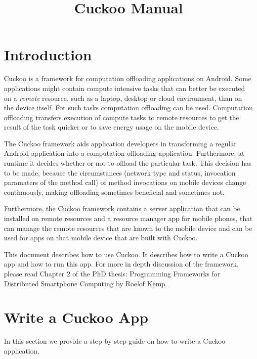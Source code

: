 \documentclass{article}
\begin{document}
\title{Cuckoo Manual}

\maketitle


\section{Introduction}
Cuckoo is a framework for computation offloading applications on Android. Some
applications might contain compute intensive tasks that can better be executed
on a \emph{remote} resource, such as a laptop, desktop or cloud environment,
than on the device itself. For such tasks computation offloading can be used.
Computation offloading transfers execution of compute tasks to remote resources
to get the result of the task quicker or to save energy usage on the mobile
device.

The Cuckoo framework aids application developers in transforming a regular
Android application into a computation offloading application. Furthermore, at
runtime it decides whether or not to offload the particular task. This decision
has to be made, because the circumstances (network type and status, invocation
paramaters of the method call) of method invocations on mobile devices change
continuously, making offloading sometimes beneficial and sometimes not.

Furthermore, the Cuckoo framework contains a server application that can be
installed on remote resources and a resource manager app for mobile phones, that
can manage the remote resources that are known to the mobile device and can be
used for apps on that mobile device that are built with Cuckoo.

This document describes how to use Cuckoo. It describes how to write a Cuckoo
app and how to run this app. For more in depth discussion of the framework,
please read Chapter 2 of the PhD thesis: Programming Frameworks for Distributed
Smartphone Computing by Roelof Kemp.

\section{Write a Cuckoo App}
In this section we provide a step by step guide on how to write a Cuckoo
application.
\end{document}

